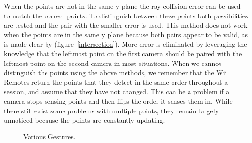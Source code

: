 \documentclass[a4paper,twoside]{article}
\begin{document}
When the points are not in the same y plane the ray collision  error can be used to match the correct points. To distinguish between these points both possibilities are tested and the pair with the smaller error is used. This method does not work when the points are in the same y plane because both pairs appear to be valid, as is made clear by (figure~\ref{intersection}). More error is eliminated by leveraging the knowledge that the leftmost point on the first camera should be paired with the leftmost point on the second camera in most situations. When we cannot distinguish the points using the above methods, we remember that the Wii Remotes return the points that they detect in the same order throughout a session, and assume that they have not changed. This can be a problem if a camera stops sensing points and then flips the order it senses them in. While there still exist some problems with multiple points, they remain largely unnoticed because the points are constantly updating. 
\begin{figure}[ht]
    \begin{center}
    \end{center}
    \caption{Various Gestures.}
    \label{gestures}
\end{figure}
\end{document}
